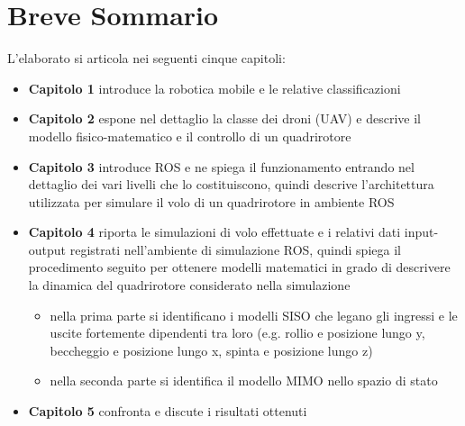 \section*{Breve Sommario}
L'elaborato si articola nei seguenti cinque capitoli:
\begin{itemize}
	\item \textbf{Capitolo 1} introduce la robotica mobile e le relative classificazioni
	\item \textbf{Capitolo 2} espone nel dettaglio la classe dei droni (\acs{UAV}) e descrive il modello fisico-matematico e il controllo di un quadrirotore 
	\item \textbf{Capitolo 3} introduce \acs{ROS} e ne spiega il funzionamento entrando nel dettaglio dei vari livelli che lo costituiscono, quindi descrive l'architettura utilizzata per simulare il volo di un quadrirotore in ambiente \acs{ROS}
	\item \textbf{Capitolo 4} riporta le simulazioni di volo effettuate e i relativi dati input-output registrati nell'ambiente di simulazione \acs{ROS}, quindi spiega il procedimento seguito per ottenere modelli matematici in grado di descrivere la dinamica del quadrirotore considerato nella simulazione
	\begin{itemize}
		\item nella prima parte si identificano i modelli \acs{SISO} che legano gli ingressi e le uscite fortemente dipendenti tra loro (e.g. rollio e posizione lungo y, beccheggio e posizione lungo x, spinta e posizione lungo z)
		\item nella seconda parte si identifica il modello \acs{MIMO} nello spazio di stato
	\end{itemize}
	\item \textbf{Capitolo 5} confronta e discute i risultati ottenuti
\end{itemize}
